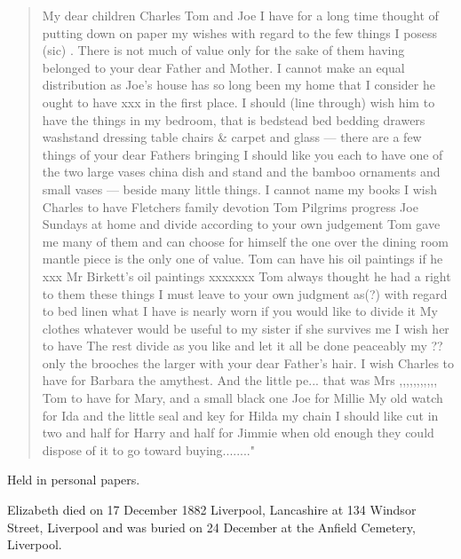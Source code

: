 \begin{quotation}
My dear children Charles Tom and Joe I have for a long time thought of putting down on paper my wishes with regard to the few things I posess (sic) . There is not much of value only for the sake of them having belonged to your dear Father and Mother. I cannot make an equal distribution as Joe’s house has so long been my home that I consider he ought to have xxx in the first place. I should (line through) wish him to have the things in my bedroom, that is bedstead bed bedding drawers washstand dressing table chairs \& carpet and glass --- there are a few things of your dear Fathers bringing I should like you each to have one of the two large vases china dish and stand and the bamboo ornaments and small vases --- beside many little things. I cannot name my books I wish Charles to have Fletchers family devotion Tom Pilgrims progress Joe Sundays at home and divide according to your own judgement Tom gave me many of them and can choose for himself the one over the dining room mantle piece is the only one of value. Tom can have his oil paintings if he xxx Mr Birkett’s oil paintings xxxxxxx Tom always thought he had a right to them these things I must leave to your own judgment as(?) with regard to bed linen what I have is nearly worn if you would like to divide it My clothes whatever would be useful to my sister if she survives me I wish her to have The rest divide as you like and let it all be done peaceably my ?? only the brooches the larger with your dear Father’s hair. I wish Charles to have for Barbara the amythest. And the little pe... that was Mrs ,,,,,,,,,,, Tom to have for Mary, and a small black one Joe for Millie
My old watch for Ida and the little seal and key for Hilda my chain I should like cut in two and half for Harry and half for Jimmie when old enough they could dispose of it to go toward buying........"
\end{quotation}

Held in personal papers.

Elizabeth died on 17 December 1882 Liverpool, Lancashire at 134 Windsor Street, Liverpool and was buried on 24 December at the Anfield Cemetery, Liverpool. \cite{EHazelwoodDeath}
